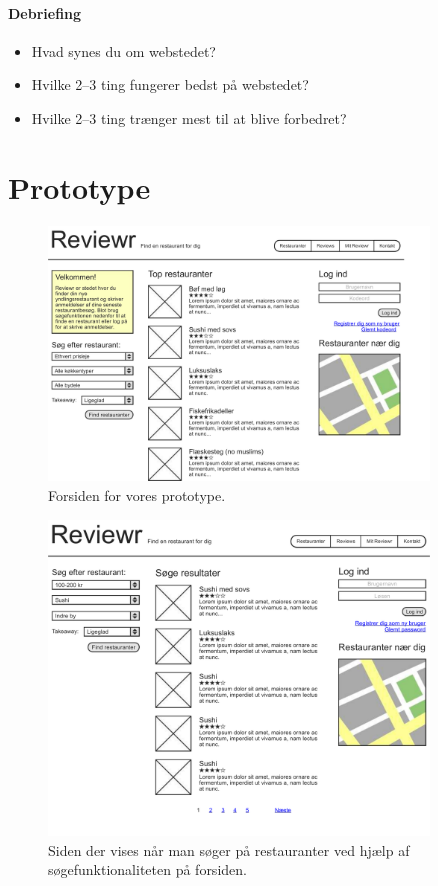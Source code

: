 \documentclass[a4paper, 12pt]{article}
\begin{document}
\paragraph{Debriefing}
\begin{itemize}
\item Hvad synes du om webstedet?
\item Hvilke 2--3 ting fungerer bedst på webstedet?
\item Hvilke 2--3 ting trænger mest til at blive forbedret?
\end{itemize}

\section{Prototype}

\begin{figure}[hp]
  \centering
  \includegraphics[width=0.9\textwidth]{mockup/page1.pdf}
  \caption{Forsiden for vores prototype.}
\end{figure}

\begin{figure}[hp]
  \centering
  \includegraphics[width=0.9\textwidth]{mockup/page2.pdf}
  \caption{Siden der vises når man søger på restauranter ved hjælp af
    søgefunktionaliteten på forsiden.}
\end{figure}
\end{document}
